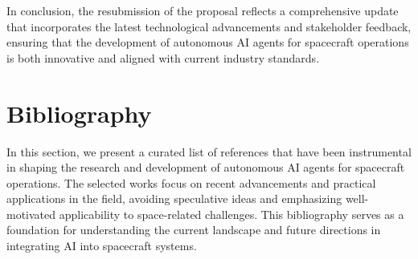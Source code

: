 \documentclass[a4paper, 11pt]{article}
\begin{document}
In conclusion, the resubmission of the proposal reflects a comprehensive update that incorporates the latest technological advancements and stakeholder feedback, ensuring that the development of autonomous AI agents for spacecraft operations is both innovative and aligned with current industry standards.
\section{Bibliography}

In this section, we present a curated list of references that have been instrumental in shaping the research and development of autonomous AI agents for spacecraft operations. The selected works focus on recent advancements and practical applications in the field, avoiding speculative ideas and emphasizing well-motivated applicability to space-related challenges. This bibliography serves as a foundation for understanding the current landscape and future directions in integrating AI into spacecraft systems.
\end{document}
